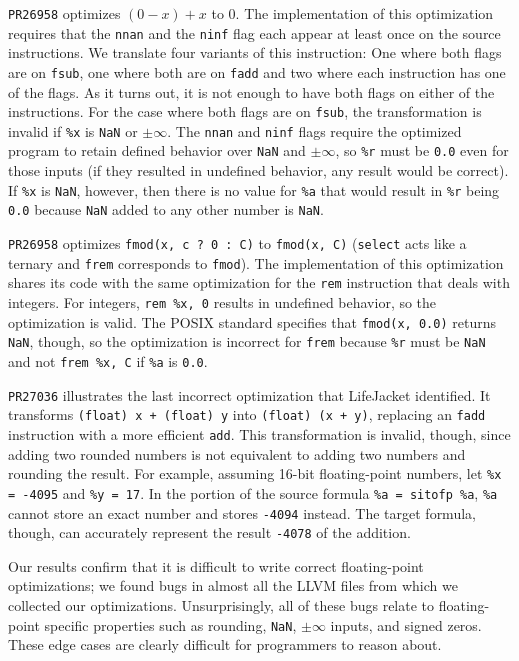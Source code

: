 \documentclass[preprint, numbers]{sigplanconf}
\newcommand{\xxx}{LifeJacket}
\begin{document}
\texttt{PR26958} optimizes $(0 - x) + x$ to $0$. The implementation of this
optimization requires that the \texttt{nnan} and the \texttt{ninf} flag each
appear at least once on the source instructions. We translate four variants of
this instruction: One where both flags are on \texttt{fsub}, one where both are
on \texttt{fadd} and two where each instruction has one of the flags.  As it
turns out, it is not enough to have both flags on either of the instructions.
For the case where both flags are on \texttt{fsub}, the transformation is
invalid if \texttt{\%x} is \texttt{NaN} or $\pm \infty$. The \texttt{nnan} and
\texttt{ninf} flags require the optimized program to retain defined behavior
over \texttt{NaN} and $\pm \infty$, so \texttt{\%r} must be \texttt{0.0} even
for those inputs (if they resulted in undefined behavior, any result would be
correct). If \texttt{\%x} is \texttt{NaN}, however, then there is no value for
\texttt{\%a} that would result in \texttt{\%r} being \texttt{0.0} because
\texttt{NaN} added to any other number is \texttt{NaN}.

\texttt{PR26958} optimizes \texttt{fmod(x, c ? 0 : C)} to \texttt{fmod(x, C)}
(\texttt{select} acts like a ternary and \texttt{frem} corresponds to
\texttt{fmod}). The implementation of this optimization shares its code with
the same optimization for the \texttt{rem} instruction that deals with
integers. For integers, \texttt{rem \%x, 0} results in undefined behavior, so
the optimization is valid.  The POSIX standard specifies that \texttt{fmod(x,
0.0)} returns \texttt{NaN}, though, so the optimization is incorrect for
\texttt{frem} because \texttt{\%r} must be \texttt{NaN} and not \texttt{frem
\%x, C} if \texttt{\%a} is \texttt{0.0}.

\texttt{PR27036} illustrates the last incorrect optimization that \xxx{}
identified.  It transforms \texttt{(float) x + (float) y} into \texttt{(float)
(x + y)}, replacing an \texttt{fadd} instruction with a more efficient
\texttt{add}.  This transformation is invalid, though, since adding two rounded
numbers is not equivalent to adding two numbers and rounding the result. For
example, assuming 16-bit floating-point numbers, let \texttt{\%x = -4095} and
\texttt{\%y = 17}. In the portion of the source formula \texttt{\%a = sitofp
\%a}, \texttt{\%a} cannot store an exact number and stores \texttt{-4094}
instead.  The target formula, though, can accurately represent the result
\texttt{-4078} of the addition.

Our results confirm that it is difficult to write correct floating-point
optimizations; we found bugs in almost all the LLVM files from which we
collected our optimizations. Unsurprisingly, all of these bugs relate to
floating-point specific properties such as rounding, \texttt{NaN}, $\pm \infty$
inputs, and signed zeros. These edge cases are clearly difficult for
programmers to reason about.
\end{document}
